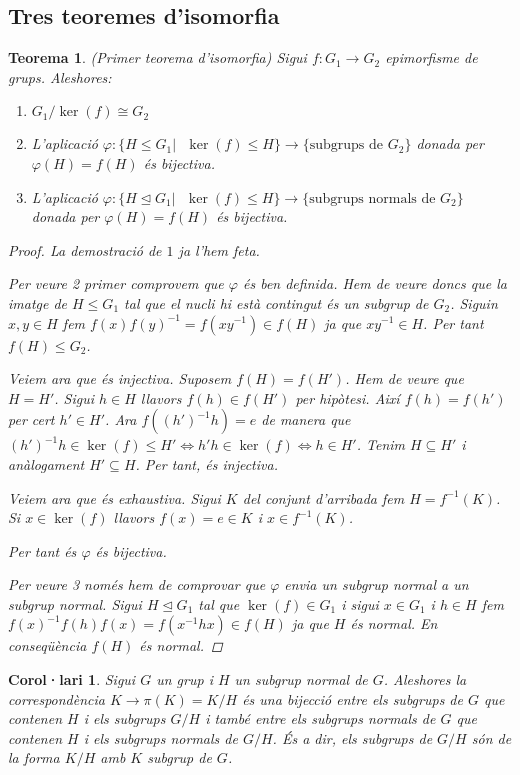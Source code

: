\documentclass[a4paper,11pt]{report}
\newcommand{\inv}[1]{#1^{-1}}
\theoremstyle{theorem}
\newtheorem{teorema}{\normalfont \sffamily\bfseries Teorema}[section]
\newtheorem{col}{\normalfont \sffamily\bfseries Corol·lari}[section]
\theoremstyle{definition}
\begin{document}
\subsection{Tres teoremes d'isomorfia}
\begin{teorema}{(Primer teorema d'isomorfia)}
	Sigui $f:G_1\longrightarrow G_2$ epimorfisme de grups. Aleshores:
	\begin{enumerate}
		\item $G_1/\ker(f) \cong G_2$
		\item L'aplicació $\varphi:\{H\leq G_1 |\text{ }\ker(f)\leq H\}\longrightarrow \{\text{subgrups de } G_2\}$ donada per $\varphi(H)=f(H)$ és bijectiva.
		\item L'aplicació $\varphi:\{H\unlhd G_1 |\text{ }\ker(f)\leq H\}\longrightarrow \{\text{subgrups normals de } G_2\}$ donada per $\varphi(H)=f(H)$ és bijectiva.
	\end{enumerate}
\begin{proof}
	La demostració de $1$ ja l'hem feta.
	
	Per veure 2 primer comprovem que $\varphi$ és ben definida. Hem de veure doncs que la imatge de $H\leq G_1$ tal que el nucli hi està contingut és un subgrup de $G_2$. Siguin $x,y\in H$ fem $f(x)\inv{f(y)}=f(x\inv{y})\in f(H)$ ja que $x\inv{y}\in H$. Per tant $f(H)\leq G_2$. 
	
	Veiem ara que és injectiva. Suposem $f(H)=f(H')$. Hem de veure que $H=H'$. Sigui $h\in H$ llavors $f(h)\in f(H')$ per hipòtesi. Així $f(h)=f(h')$ per cert $h'\in H'$. Ara $f(\inv{(h')}h)=e$ de manera que $\inv{(h')}h\in \ker(f)\leq H'\Leftrightarrow h'h\in \ker(f)\Leftrightarrow h\in H' $. Tenim $H\subseteq H'$ i anàlogament $H'\subseteq H$. Per tant, és injectiva.
	
	Veiem ara que és exhaustiva. Sigui $K$ del conjunt d'arribada fem $H=\inv{f}(K)$. Si $x\in\ker(f)$ llavors $f(x)=e\in K$ i $x\in \inv{f}(K)$.
	
	Per tant és $\varphi$ és bijectiva.
	
	Per veure 3 només hem de comprovar que $\varphi$ envia un subgrup normal a un subgrup normal. Sigui $H\unlhd G_1$ tal que $\ker(f)\in G_1$ i sigui $x\in G_1$ i $h\in H$ fem $\inv{f(x)}f(h)f(x)=f(\inv{x}hx)\in f(H)$ ja que $H$ és normal. En conseqüència $f(H)$ és normal.
\end{proof}
\end{teorema}
\begin{col}
	Sigui $G$ un grup i $H$ un subgrup normal de $G$. Aleshores la correspondència $K\rightarrow \pi(K)=K/H$ és una bijecció entre els subgrups de $G$ que contenen $H$ i els subgrups $G/H$ i també entre els subgrups normals de $G$ que contenen $H$ i els subgrups normals de $G/H$. És a dir, els subgrups de $G/H$ són de la forma $K/H$ amb $K$ subgrup de $G$.
\end{col}
\end{document}
